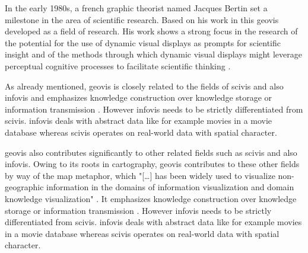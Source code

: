 In the early 1980s, a french graphic theorist named Jacques Bertin set a milestone in the area of scientific research. Based on his work in this \ac{geovis} developed as a field of research. His work shows a strong focus in the research of the potential for the use of dynamic visual displays as prompts for scientific insight and of the methods through which dynamic visual displays might leverage perceptual cognitive processes to facilitate scientific thinking .

As already mentioned, \ac{geovis} is closely related to the fields of \ac{scivis} and also \ac{infovis} and emphasizes knowledge construction over knowledge storage or information transmission . However \ac{infovis} needs to be strictly differentiated from \ac{scivis}. \ac{infovis} deals with abstract data like for example movies in a movie database whereas \ac{scivis} operates on real-world data with spatial character.

\ac{geovis} also contributes significantly to other related fields such as \ac{scivis} and also \ac{infovis}. Owing to its roots in cartography, \ac{geovis} contributes to these other fields by way of the map metaphor, which "[\ldots] has been widely used to visualize non-geographic information in the domains of information visualization and domain knowledge visualization" . It emphasizes knowledge construction over knowledge storage or information transmission . However \ac{infovis} needs to be strictly differentiated from \ac{scivis}. \ac{infovis} deals with abstract data like for example movies in a movie database whereas \ac{scivis} operates on real-world data with spatial character.

